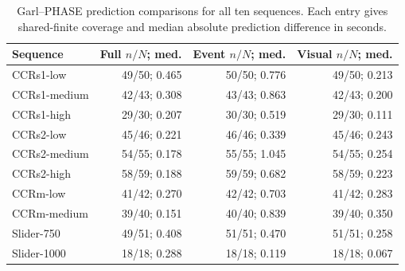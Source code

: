 \begin{table}[H]
\centering\scriptsize
\caption{Garl--PHASE prediction comparisons for all ten sequences. Each entry gives shared-finite coverage and median absolute prediction difference in seconds. }
\label{tab:evttc-sequence-disagreement}
\setlength{\tabcolsep}{3.2pt}
\begin{tabular}{@{}lrrr@{}}
\toprule
\textbf{Sequence} & \textbf{Full $n/N$; med.} & \textbf{Event $n/N$; med.} & \textbf{Visual $n/N$; med.} \\
\midrule
CCRs1-low & 49/50; 0.465 & 50/50; 0.776 & 49/50; 0.213 \\
CCRs1-medium & 42/43; 0.308 & 43/43; 0.863 & 42/43; 0.200 \\
CCRs1-high & 29/30; 0.207 & 30/30; 0.519 & 29/30; 0.111 \\
CCRs2-low & 45/46; 0.221 & 46/46; 0.339 & 45/46; 0.243 \\
CCRs2-medium & 54/55; 0.178 & 55/55; 1.045 & 54/55; 0.254 \\
CCRs2-high & 58/59; 0.188 & 59/59; 0.682 & 58/59; 0.223 \\
CCRm-low & 41/42; 0.270 & 42/42; 0.703 & 41/42; 0.283 \\
CCRm-medium & 39/40; 0.151 & 40/40; 0.839 & 39/40; 0.350 \\
Slider-750 & 49/51; 0.408 & 51/51; 0.470 & 51/51; 0.258 \\
Slider-1000 & 18/18; 0.288 & 18/18; 0.119 & 18/18; 0.067 \\
\bottomrule
\end{tabular}
\end{table}
